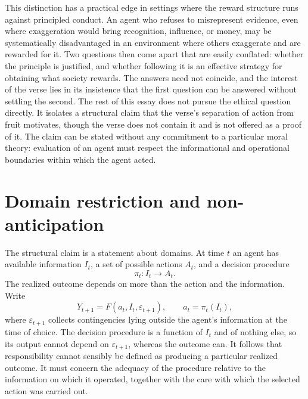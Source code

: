 \documentclass[11pt]{article}
\theoremstyle{definition}
\begin{document}
This distinction has a practical edge in settings where the reward structure runs against principled conduct. An agent who refuses to misrepresent evidence, even where exaggeration would bring recognition, influence, or money, may be systematically disadvantaged in an environment where others exaggerate and are rewarded for it. Two questions then come apart that are easily conflated: whether the principle is justified, and whether following it is an effective strategy for obtaining what society rewards. The answers need not coincide, and the interest of the verse lies in its insistence that the first question can be answered without settling the second. The rest of this essay does not pursue the ethical question directly. It isolates a structural claim that the verse's separation of action from fruit motivates, though the verse does not contain it and is not offered as a proof of it. The claim can be stated without any commitment to a particular moral theory: evaluation of an agent must respect the informational and operational boundaries within which the agent acted.

\section{Domain restriction and non-anticipation}

The structural claim is a statement about domains. At time $t$ an agent has available information $I_t$, a set of possible actions $A_t$, and a decision procedure
\[
\pi_t : I_t \to A_t .
\]
The realized outcome depends on more than the action and the information. Write
\[
Y_{t+1} = F(a_t, I_t, \varepsilon_{t+1}), \qquad a_t=\pi_t(I_t),
\]
where $\varepsilon_{t+1}$ collects contingencies lying outside the agent's information at the time of choice. The decision procedure is a function of $I_t$ and of nothing else, so its output cannot depend on $\varepsilon_{t+1}$, whereas the outcome can. It follows that responsibility cannot sensibly be defined as producing a particular realized outcome. It must concern the adequacy of the procedure relative to the information on which it operated, together with the care with which the selected action was carried out.
\end{document}
